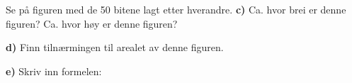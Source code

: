 Se på figuren med de 50 bitene lagt etter hverandre.\os
\textbf{c)}  Ca. hvor brei er denne figuren? Ca. hvor høy er denne figuren?\os

\textbf{d)} Finn tilnærmingen til arealet av denne figuren.\os

\textbf{e)} Skriv inn formelen:
\vsk

\begin{comment}
	{\Large \textbf{Oppgave 5}} \\[5pt]
	\begin{figure}
	\texttt{[image: /home/sindre/Pictures/sin1]}
	\end{figure}
	{\Large \textbf{Oppgave 6}} \\[5pt]
	\begin{figure}
	\texttt{[image: /home/sindre/Pictures/sin2]}
	\end{figure}
	\newpage
	{\Large \textbf{Oppgave 7}} \\[5pt]
	\begin{figure}
	\texttt{[image: /home/sindre/Pictures/sin3]}
	\end{figure}
\end{comment}



